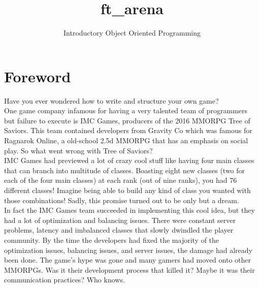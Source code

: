 \documentclass{42-en}
\begin{document}
\title{ft\_arena}
\subtitle{Introductory Object Oriented Programming}

\maketitle

\tableofcontents

\chapter{Foreword}

	Have you ever wondered how to write and structure your own game?\\

	One game company infamous for having a very talented team of programmers but
	failure to execute is IMC Games, producers of the 2016 MMORPG Tree of
	Saviors. This team contained developers from Gravity Co which was famous
	for Ragnarok Online, a old-school 2.5d MMORPG that has an emphasis on social
	play. So what went wrong with Tree of Saviors?\\

	IMC Games had previewed a lot of crazy cool stuff like having four main
	classes that can branch into multitude of classes. Boasting eight new classes
	(two for each of the four main classes) at each rank (out of nine ranks), 
	you had 76 different classes! Imagine being able to build any kind of class
	you wanted with those combinations! Sadly, this promise turned out to be only
	but a dream.\\

	In fact the IMC Games team succeeded in implementing this cool idea, but they
	had a lot of optimization and balancing issues. There were constant server
	problems, latency and imbalanced classes that slowly dwindled the player
	community. By the time the developers had fixed the majority of the
	optimization issues, balancing issues, and server issues, the damage had
	already been done. The game's hype was gone and many gamers had moved onto
	other MMORPGs. Was it their development process that killed it? Maybe it was
	their communication practices? Who knows.\\
\end{document}
